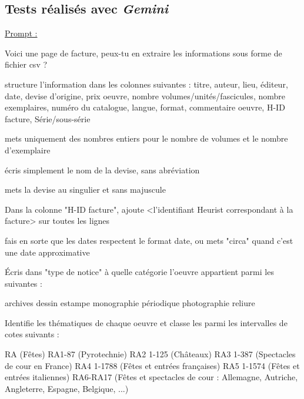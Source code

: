 \documentclass[12pt,twoside]{book}
\begin{document}
\subsection{Tests réalisés avec \emph{Gemini}}
\label{prompt gemini}

\vspace{1,5cm}
\underline{Prompt :}
\vspace{1,5cm}

Voici une page de facture, peux-tu en extraire les informations sous forme de fichier csv ? 

structure l'information dans les colonnes suivantes : titre, auteur, lieu, éditeur, date, devise d'origine, prix oeuvre, nombre volumes/unités/fascicules, nombre exemplaires, numéro du catalogue, langue, format, commentaire oeuvre, H-ID facture, Série/sous-série

mets uniquement des nombres entiers pour le nombre de volumes et le nombre d'exemplaire 

écris simplement le nom de la devise, sans abréviation 

mets la devise au singulier et sans majuscule 

Dans la colonne "H-ID facture", ajoute  <l'identifiant Heurist correspondant à la facture> sur toutes les lignes 

fais en sorte que les dates respectent le format date, ou mets "circa" quand c'est une date approximative  

Écris dans "type de notice" à quelle catégorie l'oeuvre appartient parmi les suivantes : 


archives
dessin
estampe
monographie
périodique
photographie
reliure




Identifie les thématiques de chaque oeuvre et classe les parmi les intervalles de cotes suivants : 


RA (Fêtes)
RA1-87 (Pyrotechnie)
RA2 1-125 (Châteaux)
RA3 1-387 (Spectacles de cour en France)
RA4 1-1788 (Fêtes et entrées françaises)
RA5 1-1574 (Fêtes et entrées italiennes)
RA6-RA17 (Fêtes et spectacles de cour : Allemagne, Autriche, Angleterre, Espagne, Belgique, ...)
\end{document}

